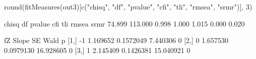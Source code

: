 \begin{Schunk}
\begin{Sinput}
 round(fitMeasures(out3)[c("chisq", "df", "pvalue", "cfi", 
                           "tli", "rmsea", "srmr")], 3)
\end{Sinput}
\begin{Soutput}
  chisq      df  pvalue     cfi     tli   rmsea    srmr 
 74.899 113.000   0.998   1.000   1.015   0.000   0.020 
\end{Soutput}
\begin{Soutput}
     fZ    Slope        SE      Wald p
[1,] -1 1.169652 0.1572049  7.440306 0
[2,]  0 1.657530 0.0979130 16.928605 0
[3,]  1 2.145409 0.1426381 15.040921 0
\end{Soutput}
\end{Schunk}
